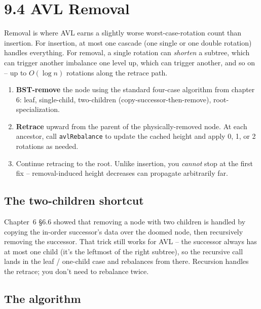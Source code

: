 \documentclass[11pt]{article}
\begin{document}
\section{9.4 AVL Removal}

Removal is where AVL earns a slightly worse worst-case-rotation count than insertion. For insertion, at most one cascade (one single or one double rotation) handles everything. For removal, a single rotation can \emph{shorten} a subtree, which can trigger another imbalance one level up, which can trigger another, and so on -- up to $O(\log n)$ rotations along the retrace path.

\begin{defnbox}
\begin{enumerate}[leftmargin=*]
    \item \textbf{BST-remove} the node using the standard four-case algorithm from chapter 6: leaf, single-child, two-children (copy-successor-then-remove), root-specialization.
    \item \textbf{Retrace} upward from the parent of the physically-removed node. At each ancestor, call \texttt{avlRebalance} to update the cached height and apply 0, 1, or 2 rotations as needed.
    \item Continue retracing to the root. Unlike insertion, you \emph{cannot} stop at the first fix -- removal-induced height decreases can propagate arbitrarily far.
\end{enumerate}
\end{defnbox}

\subsection*{The two-children shortcut}

Chapter~6 \S6.6 showed that removing a node with two children is handled by copying the in-order successor's data over the doomed node, then recursively removing the successor. That trick still works for AVL -- the successor always has at most one child (it's the leftmost of the right subtree), so the recursive call lands in the leaf / one-child case and rebalances from there. Recursion handles the retrace; you don't need to rebalance twice.

\subsection*{The algorithm}
\end{document}
